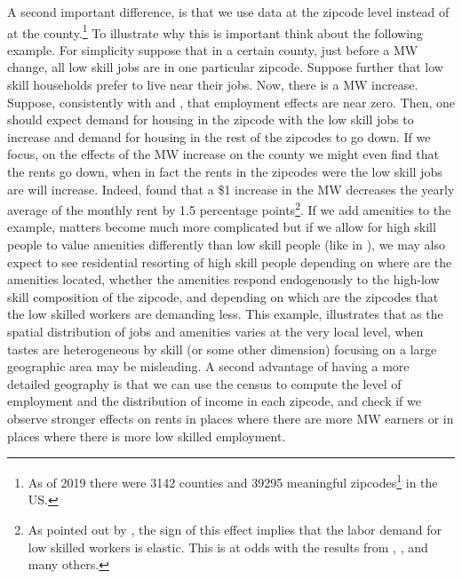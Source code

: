 \documentclass{article}
\begin{document}
A second important difference, is that we use data at the zipcode level instead of at the county.\footnote{As of 2019 there were 3142 counties and 39295 meaningful zipcodes\footnote{We exclude military and unique business zipcodes as they are irrelevant for house prices.} in the US.} To illustrate why this is important think about the following example. For simplicity suppose that in a certain county, just before a MW change, all low skill jobs are in one particular zipcode. Suppose further that low skill households prefer to live near their jobs. Now, there is a MW increase. Suppose, consistently with \textcite{card2000minimum} and \textcite{cengiz2019effect}, that employment effects are near zero. Then, one should expect demand for housing in the zipcode with the low skill jobs to increase and demand for housing in the rest of the zipcodes to go down. If we focus, on the effects of the MW increase on the county we might even find that the rents go down, when in fact the rents in the zipcodes were the low skill jobs are will increase. Indeed, \textcite{tidemann2018mw} found that a \$1 increase in the MW decreases the yearly average of the monthly rent by 1.5 percentage points\footnote{As pointed out by \textcite{tidemann2018mw}, the sign of this effect implies that the labor demand for low skilled workers is elastic. This is at odds with the results from \textcite{card2000minimum}, \textcite{cengiz2019effect}, and many others.}. If we add amenities to the example, matters become much more complicated but if we allow for high skill people to value amenities differently than low skill people (like in \textcite{diamond2016determinants}), we may also expect to see residential resorting of high skill people depending on where are the amenities located, whether the amenities respond endogenously to the high-low skill composition of the zipcode, and depending on which are the zipcodes that the low skilled workers are demanding less. This example, illustrates that as the spatial distribution of jobs and amenities varies at the very local level, when tastes are heterogeneous by skill (or some other dimension) focusing on a large geographic area may be misleading. A second advantage of having a more detailed geography is that we can use the census to compute the level of employment and the distribution of income in each zipcode, and check if we observe stronger effects on rents in places where there are more MW earners or in places where there is more low skilled employment. 
\end{document}
